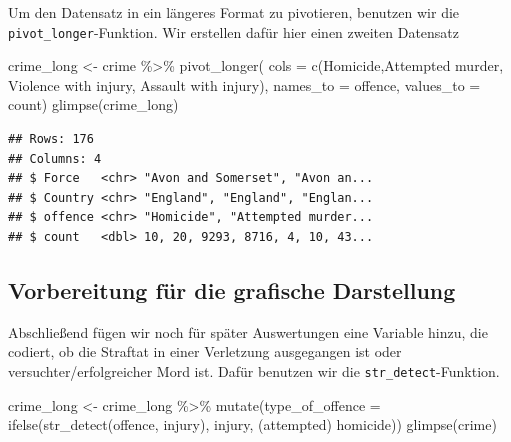 \documentclass[
]{book}
\newenvironment{Shaded}{\begin{snugshade}}{\end{snugshade}}
\newcommand{\AttributeTok}[1]{\textcolor[rgb]{0.77,0.63,0.00}{#1}}
\newcommand{\FunctionTok}[1]{\textcolor[rgb]{0.00,0.00,0.00}{#1}}
\newcommand{\NormalTok}[1]{#1}
\newcommand{\OtherTok}[1]{\textcolor[rgb]{0.56,0.35,0.01}{#1}}
\newcommand{\SpecialCharTok}[1]{\textcolor[rgb]{0.00,0.00,0.00}{#1}}
\newcommand{\StringTok}[1]{\textcolor[rgb]{0.31,0.60,0.02}{#1}}
\begin{document}
Um den Datensatz in ein längeres Format zu pivotieren, benutzen wir die \texttt{pivot\_longer}-Funktion.
Wir erstellen dafür hier einen zweiten Datensatz

\begin{Shaded}
\begin{Highlighting}[]
\NormalTok{crime\_long }\OtherTok{\textless{}{-}}\NormalTok{ crime }\SpecialCharTok{\%\textgreater{}\%} 
  \FunctionTok{pivot\_longer}\NormalTok{(}
    \AttributeTok{cols =} \FunctionTok{c}\NormalTok{(}\StringTok{\textquotesingle{}Homicide\textquotesingle{}}\NormalTok{,}\StringTok{\textquotesingle{}Attempted murder\textquotesingle{}}\NormalTok{, }
             \StringTok{\textquotesingle{}Violence with injury\textquotesingle{}}\NormalTok{, }\StringTok{\textquotesingle{}Assault with injury\textquotesingle{}}\NormalTok{),}
    \AttributeTok{names\_to =} \StringTok{\textquotesingle{}offence\textquotesingle{}}\NormalTok{, }
    \AttributeTok{values\_to =} \StringTok{\textquotesingle{}count\textquotesingle{}}\NormalTok{)}
\FunctionTok{glimpse}\NormalTok{(crime\_long)}
\end{Highlighting}
\end{Shaded}

\begin{verbatim}
## Rows: 176
## Columns: 4
## $ Force   <chr> "Avon and Somerset", "Avon an...
## $ Country <chr> "England", "England", "Englan...
## $ offence <chr> "Homicide", "Attempted murder...
## $ count   <dbl> 10, 20, 9293, 8716, 4, 10, 43...
\end{verbatim}

\hypertarget{vorbereitung-fuxfcr-die-grafische-darstellung}{%
\subsection{Vorbereitung für die grafische Darstellung}\label{vorbereitung-fuxfcr-die-grafische-darstellung}}

Abschließend fügen wir noch für später Auswertungen eine Variable hinzu, die codiert, ob die Straftat in einer Verletzung ausgegangen ist oder versuchter/erfolgreicher Mord ist. Dafür benutzen wir die \texttt{str\_detect}-Funktion.

\begin{Shaded}
\begin{Highlighting}[]
\NormalTok{crime\_long }\OtherTok{\textless{}{-}}\NormalTok{ crime\_long }\SpecialCharTok{\%\textgreater{}\%} 
  \FunctionTok{mutate}\NormalTok{(}\AttributeTok{type\_of\_offence =} \FunctionTok{ifelse}\NormalTok{(}\FunctionTok{str\_detect}\NormalTok{(offence, }\StringTok{\textquotesingle{}injury\textquotesingle{}}\NormalTok{),}
                                  \StringTok{\textquotesingle{}injury\textquotesingle{}}\NormalTok{,}
                                  \StringTok{\textquotesingle{}(attempted) homicide\textquotesingle{}}\NormalTok{))}
\FunctionTok{glimpse}\NormalTok{(crime)}
\end{Highlighting}
\end{Shaded}
\end{document}
